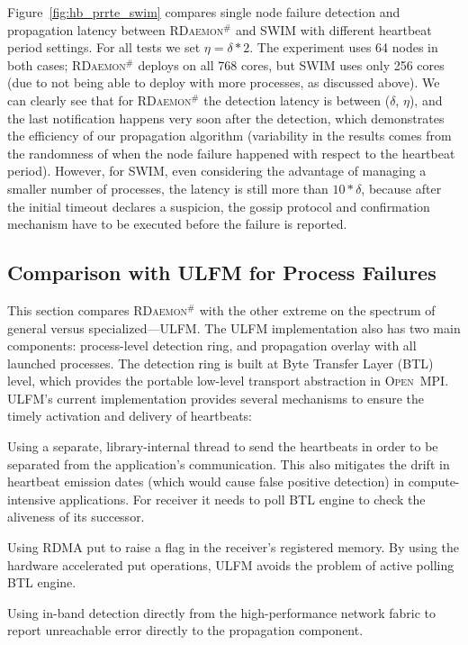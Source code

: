 \documentclass[sigconf]{acmart}
\newcommand{\ompi}[0]{\textsc{Open~MPI}\xspace}
\newcommand{\ulfm}[0]{\textsc{ULFM}\xspace}
\newcommand{\ourwork}[0]{\textsc{RDaemon}\ensuremath{^\#}\xspace}
\begin{document}
Figure~\ref{fig:hb_prrte_swim} compares single node failure detection and propagation latency between \ourwork and SWIM 
with different heartbeat period settings. For all tests we set $ \eta = \delta * 2 $. The 
experiment uses 64 nodes in both cases; \ourwork deploys on all 768 cores, but SWIM uses only 
256 cores (due to not being able to deploy with more processes, as discussed above).
 We can clearly see that for \ourwork the detection latency is between ($\delta$, $\eta$), and the last notification happens very soon after the detection, which demonstrates the efficiency of our propagation algorithm (variability in the results comes from the randomness of when the node failure happened with respect to the heartbeat period). However, for SWIM, even considering the advantage of managing a 
 smaller number of processes, the latency is still more than $10*\delta$, because after the initial timeout declares a suspicion, the gossip protocol and confirmation mechanism have to be executed
before the failure is reported.

\subsection{Comparison with \ulfm for Process Failures}
This section compares \ourwork with the other extreme on the spectrum of
general versus specialized---\ulfm. The \ulfm implementation also has two
 main components: process-level detection ring, and propagation overlay with all launched processes. The detection ring is built at Byte Transfer Layer (BTL) level, which provides the portable low-level transport abstraction in \ompi. \ulfm's current implementation provides several mechanisms to ensure the timely activation and delivery of heartbeats:
\begin{compactenum}
  \item Using a separate, library-internal thread to send the heartbeats in order to be separated from the application's communication. This also mitigates the drift in heartbeat
  emission dates (which would cause false positive detection) in compute-intensive applications.
  For receiver it needs to poll BTL engine to check the aliveness of its successor.
  \item Using RDMA put to raise a flag in the receiver's registered memory. By using the hardware accelerated put operations, \ulfm avoids the problem of active polling BTL engine.
  \item Using in-band detection directly from the high-performance network
  fabric to report unreachable error directly to the propagation component.
\end{compactenum}
\end{document}
